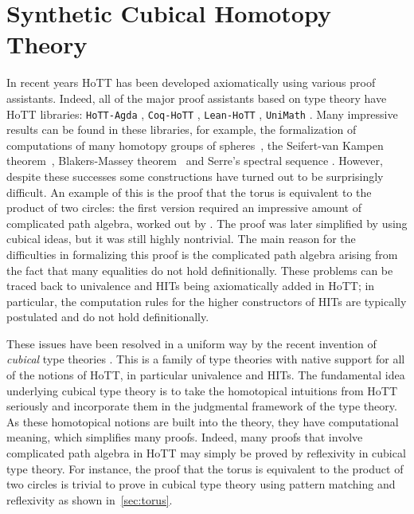 \setchapterpreamble[u]{\margintoc}
\chapter{Synthetic Cubical Homotopy Theory}

In recent years HoTT has been developed axiomatically using various
proof assistants. Indeed, all of the major proof assistants based on
type theory have HoTT libraries: \texttt{HoTT-Agda} , \texttt{Coq-HoTT}
, \texttt{Lean-HoTT} , \texttt{UniMath}
. Many impressive results can be found in these
libraries, for example, the formalization of computations of many
homotopy groups of spheres~, the
Seifert-van Kampen theorem~, Blakers-Massey
theorem~ %
and Serre's spectral sequence . However, despite
these successes some constructions have turned out to be surprisingly
difficult. An example of this is the proof that the torus is
equivalent to the product of two circles: the first version required
an impressive amount of complicated path algebra, worked out by
. The proof was later simplified by
 using cubical ideas, but it was still highly
nontrivial. The main reason for the difficulties in formalizing this
proof is the complicated path algebra arising from the fact that many
equalities do not hold definitionally. These problems can be traced
back to univalence and HITs being axiomatically added in HoTT; in
particular, the computation rules for the higher constructors of HITs
are typically postulated and do not hold definitionally.

These issues have been resolved in a uniform way by the recent
invention of \emph{cubical} type theories
. This is a family of type
theories with native support for all of the notions of HoTT, in
particular univalence and HITs. The fundamental idea underlying
cubical type theory is to take the homotopical intuitions from HoTT
seriously and incorporate them in the judgmental framework of the type
theory. As these homotopical notions are built into the theory, they
have computational meaning, which simplifies many proofs. Indeed, many
proofs that involve complicated path algebra in HoTT may simply be
proved by reflexivity in cubical type theory. For instance, the proof
that the torus is equivalent to the product of two circles is trivial
to prove in cubical type theory using pattern matching and reflexivity
as shown in~\cref{sec:torus}.

